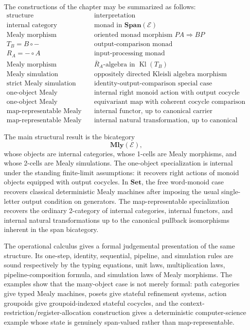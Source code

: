 The constructions of the chapter may be summarized as follows:
\[
\begin{array}{c|l}
\text{structure} & \text{interpretation} \\
\hline
\text{internal category}
&
\text{monad in }\mathbf{Span}(\mathcal E)
\\
\text{Mealy morphism}
&
\text{oriented monad morphism }P A\Rightarrow B P
\\
T_B=B\circ -
&
\text{output-comparison monad}
\\
R_A=-\circ A
&
\text{input-processing monad}
\\
\text{Mealy morphism}
&
\overline R_A\text{-algebra in }\operatorname{Kl}(T_B)
\\
\text{Mealy simulation}
&
\text{oppositely directed Kleisli algebra morphism}
\\
\text{strict Mealy simulation}
&
\text{identity-output-comparison special case}
\\
\text{one-object Mealy morphism}
&
\text{internal right monoid action with output cocycle}
\\
\text{one-object Mealy simulation}
&
\text{equivariant map with coherent cocycle comparison}
\\
\text{map-representable Mealy morphism}
&
\text{internal functor, up to canonical carrier isomorphism}
\\
\text{map-representable Mealy simulation}
&
\text{internal natural transformation, up to canonical carrier isomorphism.}
\end{array}
\]

The main structural result is the bicategory
\[
    \mathbf{Mly}(\mathcal E),
\]
whose objects are internal categories, whose 1-cells are Mealy morphisms, and
whose 2-cells are Mealy simulations. The one-object specialization is internal
under the standing finite-limit assumptions: it recovers right actions of
monoid objects equipped with output cocycles. In \(\mathbf{Set}\), the free
word-monoid case recovers classical deterministic Mealy machines after imposing
the usual single-letter output condition on generators. The map-representable
specialization recovers the ordinary 2-category of internal categories,
internal functors, and internal natural transformations up to the canonical
pullback isomorphisms inherent in the span bicategory.

The operational calculus gives a formal judgemental presentation of the same
structure. Its one-step, identity, sequential, pipeline, and simulation rules
are sound respectively by the typing equations, unit laws, multiplication laws,
pipeline-composition formula, and simulation laws of Mealy morphisms. The
examples show that the many-object case is not merely formal: path categories
give typed Mealy machines, posets give stateful refinement systems, action
groupoids give groupoid-indexed stateful cocycles, and the
context-restriction/register-allocation construction gives a deterministic
computer-science example whose state is genuinely span-valued rather than
map-representable.
